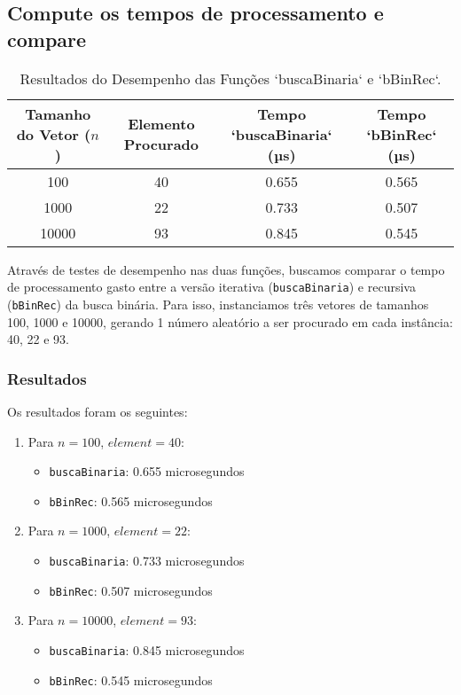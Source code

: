 \subsection{Compute os tempos de processamento e compare}

\begin{table}[ht]
    \centering
    \caption{Resultados do Desempenho das Funções `buscaBinaria` e `bBinRec`.}
    \begin{tabular}{@{}cccc@{}}
        \toprule
        Tamanho do Vetor (\(n\)) & Elemento Procurado & Tempo `buscaBinaria` (µs) & Tempo `bBinRec` (µs) \\ \midrule
        100       & 40 & 0.655               & 0.565               \\
        1000      & 22 & 0.733              & 0.507              \\
        10000     & 93 & 0.845             & 0.545               \\ \bottomrule
    \end{tabular}
    \label{tab:resultados}
\end{table}

Através de testes de desempenho nas duas funções, buscamos comparar o tempo de processamento gasto entre a versão iterativa (\texttt{buscaBinaria}) e recursiva (\texttt{bBinRec}) da busca binária. Para isso, instanciamos três vetores de tamanhos 100, 1000 e 10000, gerando 1 número aleatório a ser procurado em cada instância: 40, 22 e 93.

\subsubsection{Resultados}
Os resultados foram os seguintes:

\begin{enumerate}
    \item Para \( n = 100 \), \( element = 40 \):
    \begin{itemize}
        \item \texttt{buscaBinaria}: 0.655 microsegundos
        \item \texttt{bBinRec}: 0.565 microsegundos
    \end{itemize}

    \item Para \( n = 1000 \), \( element = 22 \):
    \begin{itemize}
        \item \texttt{buscaBinaria}: 0.733 microsegundos
        \item \texttt{bBinRec}: 0.507 microsegundos
    \end{itemize}

    \item Para \( n = 10000 \), \( element = 93 \):
    \begin{itemize}
        \item \texttt{buscaBinaria}: 0.845 microsegundos
        \item \texttt{bBinRec}: 0.545 microsegundos
    \end{itemize}
\end{enumerate}

